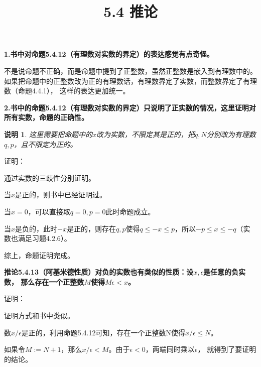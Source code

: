 \documentclass{article}
\theoremstyle{mystyle}
\newtheorem*{zremark}{说明}
\begin{document}
\title{5.4 推论}
\maketitle

\textbf{1.书中对命题5.4.12（有理数对实数的界定）的表达感觉有点奇怪。}

不是说命题不正确，而是命题中提到了正整数，虽然正整数是嵌入到有理数中的。
如果把命题中的正整数改为正的有理数话，有理数界定了实数，而整数界定了有理数（命题4.4.1），
这样的表达更加统一。

\textbf{2.书中的命题5.4.12（有理数对实数的界定）只说明了正实数的情况，这里证明对所有实数，命题的正确性。}

\begin{zgraytheorem}
  \begin{zremark}
    这里需要把命题中的$x$改为实数，不限定其是正的，把$q,N$分别改为有理数$q,p$，且不限定为正的。
  \end{zremark}
\end{zgraytheorem}

证明：

通过实数的三歧性分别证明。

当$x$是正的，则书中已经证明过。

当$x=0$，可以直接取$q=0,p=0$此时命题成立。

当$x$是负的，此时$-x$是正的，则存在$q,p$使得$q \leq -x \leq p$，所以$-p \leq x \leq -q$（实数也满足习题4.2.6）。

综上，命题证明完成。

\textbf{
  推论5.4.13（阿基米德性质）对负的实数也有类似的性质：设$x,\epsilon$是任意的负实数，
  那么存在一个正整数$M$使得$M\epsilon < x$。
}

证明：

证明方式和书中类似。

数$x / \epsilon$是正的，利用命题5.4.12可知，存在一个正整数N使得$x / \epsilon \leq N$。

如果令$M := N + 1$，那么$x / \epsilon < M$。由于$\epsilon < 0$，两端同时乘以$\epsilon$，
就得到了要证明的结论。
\end{document}
